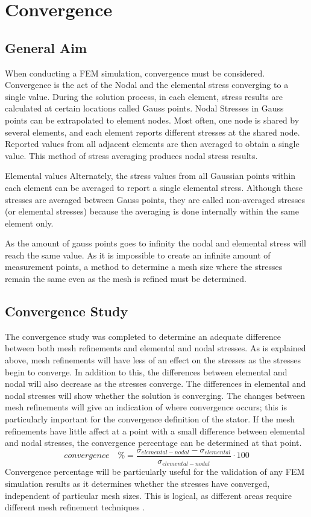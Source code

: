 \section{Convergence}
\label{AppendixD}
\subsection*{General Aim}
When conducting a FEM simulation, convergence must be considered. Convergence is the act of the Nodal and the elemental stress converging to a single value. During the solution process, in each element, stress results are calculated at certain locations called Gauss points. Nodal Stresses in Gauss points can be extrapolated to element nodes. Most often, one node is shared by several elements, and each element reports different stresses at the shared node. Reported values from all adjacent elements are then averaged to obtain a single value. This method of stress averaging produces nodal stress results. 

Elemental values Alternately, the stress values from all Gaussian points within each element can be averaged to report a single elemental stress. Although these stresses are averaged between Gauss points, they are called non-averaged 
stresses (or elemental stresses) because the averaging is done internally within the same element only.

As the amount of gauss points goes to infinity the nodal and elemental stress will reach the same value. As it is impossible to create an infinite amount of measurement points, a method to determine a mesh size where the stresses remain the same even as the mesh is refined must be determined. 

\subsection*{Convergence Study}
The convergence study was completed to determine an adequate difference between both mesh refinements and elemental and nodal stresses. As is explained above, mesh refinements will have less of an effect on the stresses as the stresses begin to converge. In addition to this, the differences between elemental and nodal will also decrease as the stresses converge. The differences in elemental and nodal stresses will show whether the solution is converging. The changes between mesh refinements will give an indication of where convergence occurs; this is particularly important for the convergence definition of the stator. If the mesh refinements have little affect at a point with a small difference between elemental and nodal stresses, the convergence percentage can be determined at that point.
\begin{equation}
convergence\quad \%  = \frac{\sigma_{elemental-nodal} - \sigma_{elemental} }{\sigma_{elemental-nodal}} \cdot 100
\end{equation}
Convergence percentage will be particularly useful for the validation of any FEM simulation results as it determines whether the stresses have converged, independent of particular mesh sizes. This is logical, as different areas require different mesh refinement techniques \cite{convergence}.
